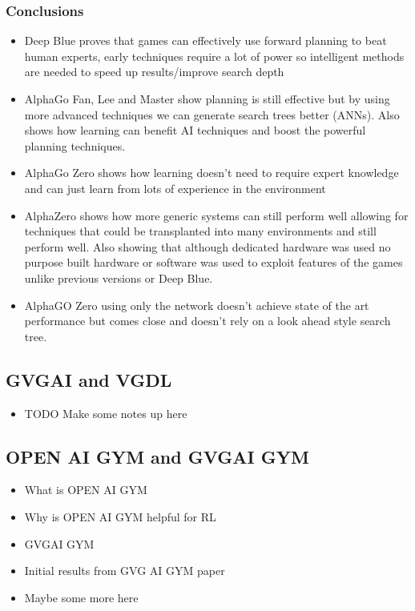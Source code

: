 \documentclass[a4paper]{article}
\begin{document}
\subsubsection{Conclusions}
\begin{itemize}
    \item Deep Blue proves that games can effectively use forward planning to beat human experts, early techniques require a lot of power so intelligent methods are needed to speed up results/improve search depth
    \item AlphaGo Fan, Lee and Master show planning is still effective but by using more advanced techniques we can generate search trees better (ANNs).
    Also shows how learning can benefit AI techniques and boost the powerful planning techniques.
    \item AlphaGo Zero shows how learning doesn't need to require expert knowledge and can just learn from lots of experience in the environment
    \item AlphaZero shows how more generic systems can still perform well allowing for techniques that could be transplanted into many environments and still perform well.
    Also showing that although dedicated hardware was used no purpose built hardware or software was used to exploit features of the games unlike previous versions or Deep Blue.
    \item AlphaGO Zero using only the network doesn't achieve state of the art performance but comes close and doesn't rely on a look ahead style search tree.
\end{itemize}


\subsection{GVGAI and VGDL}
\begin{itemize}
    \item TODO Make some notes up here
\end{itemize}
\subsection{OPEN AI GYM and GVGAI GYM}
\begin{itemize}
    \item What is OPEN AI GYM
    \item Why is OPEN AI GYM helpful for RL
    \item GVGAI GYM
    \item Initial results from GVG AI GYM paper
    \item Maybe some more here
\end{itemize}\cite{GVGAIGYM}
\end{document}
